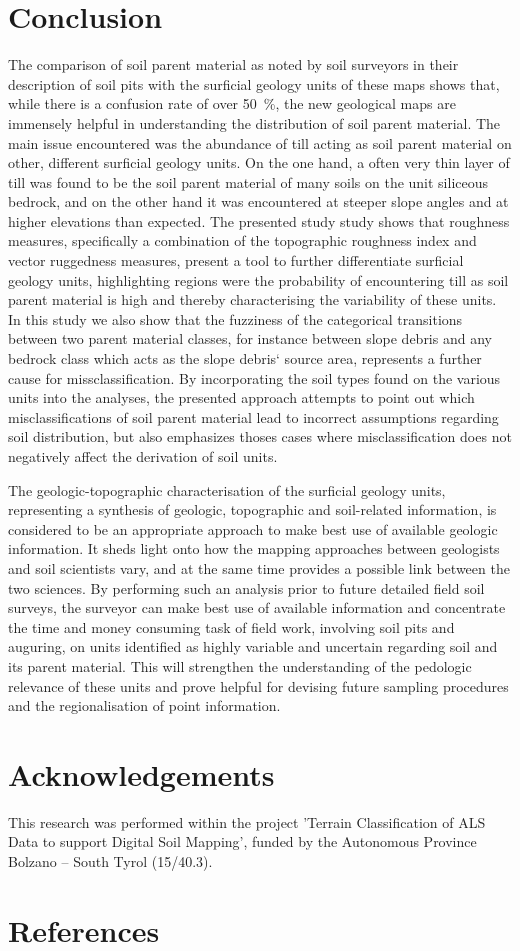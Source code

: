 \documentclass[preprint,12pt,authoryear]{elsarticle}
\begin{document}
\section{Conclusion}
 The comparison of soil parent material as noted by soil surveyors in their description of soil pits with the surficial geology units of these maps shows that, while there is a confusion rate of over 50~\%, the new geological maps are immensely helpful in understanding the distribution of soil parent material. The main issue encountered was the abundance of till acting as soil parent material on other, different surficial geology units. On the one hand, a often very thin layer of till was found to be the soil parent material of many soils on the unit siliceous bedrock, and on the other hand it was encountered  at steeper slope angles and at higher elevations than expected. The presented study study shows that roughness measures, specifically a combination of the topographic roughness index and  vector ruggedness measures, present a tool to further differentiate surficial geology units, highlighting regions were the probability of encountering till as soil parent material is high and thereby characterising the variability of these units. In this study we also show that the fuzziness of the  categorical transitions between two parent material classes, for instance between slope debris and any bedrock class which acts as the slope debris` source area, represents a further cause for missclassification. By incorporating the soil types found on the various units into the analyses, the presented approach attempts to point out which misclassifications of soil parent material lead to incorrect assumptions regarding soil distribution, but also emphasizes thoses cases where misclassification does not negatively affect the derivation of soil units. 

The geologic-topographic characterisation of the surficial geology units, representing a synthesis of geologic, topographic and soil-related information, is considered to be an appropriate approach to make best use of available geologic information.  It sheds light onto how the mapping approaches between geologists and soil scientists vary, and at the same time provides a possible link between the two sciences. By performing such an analysis prior to future detailed field soil surveys, the surveyor can make best use of available information and concentrate the time and money consuming task of field work, involving soil pits and auguring, on units identified as highly variable and uncertain regarding soil and its parent material. This will strengthen the understanding of the pedologic relevance of these units and prove  helpful for devising future sampling procedures and the regionalisation of point information.


\section*{Acknowledgements} This research was performed within the project 'Terrain Classification of ALS Data to support Digital Soil Mapping', funded by the Autonomous Province Bolzano -- South Tyrol (15/40.3).

\section*{References}

\end{document}
